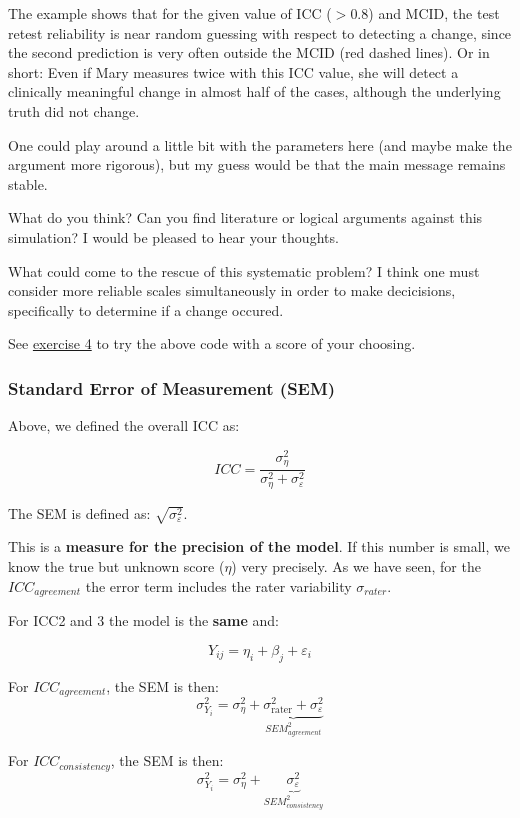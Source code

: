 \documentclass[
]{article}
\begin{document}
The example shows that for the given value of ICC (\(>0.8\)) and MCID, the test retest reliability
is near random guessing with respect to detecting a change, since the second prediction is
very often outside the MCID (red dashed lines). Or in short: Even if Mary measures twice
with this ICC value, she will detect a clinically meaningful change in almost half of the cases,
although the underlying
truth did not change.

One could play around a little bit with the parameters here
(and maybe make the argument more rigorous),
but my guess would be that the main message remains stable.

What do you think? Can you find literature or logical arguments against this
simulation? I would be pleased to hear your thoughts.

What could come to the rescue of this systematic problem?
I think one must consider more reliable scales simultaneously in order
to make decicisions, specifically to determine if a change occured.

See \hyperref[exercise4]{exercise 4} to try the above code with a score of your choosing.

\subsubsection{Standard Error of Measurement (SEM)}\label{standard-error-of-measurement-sem}

Above, we defined the overall ICC as:

\[ICC = \frac{\sigma_{\eta}^2}{\sigma_{\eta}^2 + \sigma_{\varepsilon}^2}\]

The SEM is defined as: \(\sqrt{\sigma_{\varepsilon}^2}\).

This is a \textbf{measure for the precision of the model}. If this number is small,
we know the true but unknown score (\(\eta\)) very precisely. As we have seen, for the
\(ICC_{agreement}\) the error term includes the rater variability \(\sigma_{rater}\).

For ICC2 and 3 the model is the \textbf{same} and:

\[Y_{ij} = \eta_i + \beta_j + \varepsilon_i\]

For \(ICC_{agreement}\), the SEM is then:
\[\sigma_{Y_i}^2 = \sigma_{\eta}^2 + \underbrace{\sigma_{\text{rater}}^2 + \sigma_{\varepsilon}^2}_{SEM_{agreement}^2}\]

For \(ICC_{consistency}\), the SEM is then:
\[\sigma_{Y_i}^2 = \sigma_{\eta}^2 + \underbrace{\sigma_{\varepsilon}^2}_{SEM_{consistency}^2}\]
\end{document}
